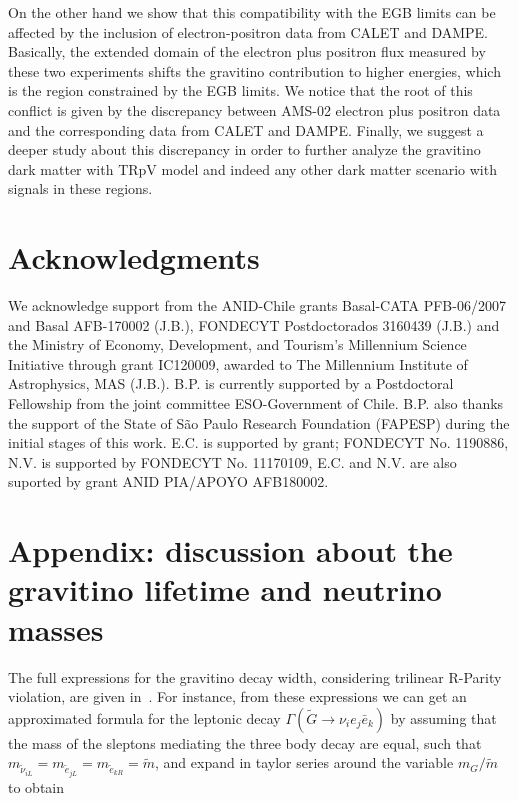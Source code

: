 \documentclass[a4paper,11pt]{article}
\begin{document}
On the other hand we show that this compatibility with the EGB limits can be affected by the inclusion of electron-positron data from CALET and DAMPE. Basically, the extended domain of the electron plus positron flux measured by these two experiments shifts the gravitino contribution to higher energies, which is the region constrained by the EGB limits. We notice that the root of this conflict is given by the discrepancy between AMS-02 electron plus positron data and the corresponding data from CALET and DAMPE. Finally, we suggest a deeper study about this discrepancy in order to further analyze the gravitino dark matter with TRpV model and indeed any other dark matter scenario with signals in these regions.  

\section*{Acknowledgments}

{\small 
We acknowledge support from the ANID-Chile grants Basal-CATA
PFB-06/2007 and Basal AFB-170002 (J.B.), FONDECYT Postdoctorados 3160439 (J.B.) and the Ministry of Economy, Development, and Tourism's Millennium Science Initiative through grant IC120009, awarded to The Millennium Institute of Astrophysics, MAS (J.B.). B.P. is currently supported by a Postdoctoral Fellowship from the joint committee ESO-Government of Chile. B.P. also thanks the support of the State of S\~{a}o Paulo Research Foundation (FAPESP) during the initial stages of this work. E.C. is supported by grant; FONDECYT No. 1190886, N.V. is supported by FONDECYT No. 11170109, E.C. and N.V. are also suported by grant ANID PIA/APOYO AFB180002.

}

\appendix
\section{Appendix: discussion about the gravitino lifetime and neutrino masses}
\label{sec:lifetime-neutrinomasses}

The full expressions for the gravitino decay width, considering trilinear
R-Parity violation, are given in~\cite{Moreau:2001sr}. For instance, from
these expressions we can get an approximated formula for the leptonic
decay $\Gamma(\tilde{G}\rightarrow\nu_{i}e_{j}\bar{e}_{k})$ by assuming
that the mass of the sleptons mediating the three body decay are
equal, such that $m_{\tilde{\nu}_{iL}}=m_{\tilde{e}_{jL}}=m_{\tilde{e}_{kR}}=\tilde{m}$,
and expand in taylor series around the variable $m_{G}/\tilde{m}$
to obtain
\end{document}

